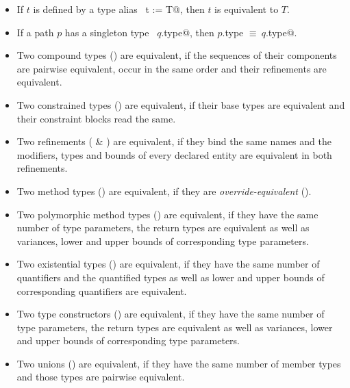 \begin{itemize}
\item
If $t$ is defined by a type alias ~\lstinline@type t := T@, then $t$ is equivalent to $T$. 

\item
If a path $p$ has a singleton type ~\lstinline@$q$.type@, then \lstinline@$p$.type $\equiv\ q$.type@. 

\item
Two compound types () are equivalent, if the sequences of their components are pairwise equivalent, occur in the same order and their refinements are equivalent.

\item
Two constrained types () are equivalent, if their base types are equivalent and their constraint blocks read the same. 

\item
Two refinements ( \& ) are equivalent, if they bind the same names and the modifiers, types and bounds of every declared entity are equivalent in both refinements. 

\item
Two method types () are equivalent, if they are {\em override-equivalent} ().

\item
Two polymorphic method types () are equivalent, if they have the same number of type parameters, the return types are equivalent as well as variances, lower and upper bounds of corresponding type parameters. 

\item
Two existential types () are equivalent, if they have the same number of quantifiers and the quantified types as well as lower and upper bounds of corresponding quantifiers are equivalent. 

\item
Two type constructors () are equivalent, if they have the same number of type parameters, the return types are equivalent as well as variances, lower and upper bounds of corresponding type parameters. 

\item 
Two unions () are equivalent, if they have the same number of member types and those types are pairwise equivalent. 

\end{itemize}






